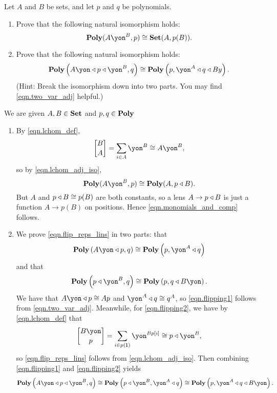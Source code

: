 \documentclass[Book-Poly]{subfiles}
\begin{document}
\begin{exercise}
Let $A$ and $B$ be sets, and let $p$ and $q$ be polynomials.
\begin{enumerate}
    \item Prove that the following natural isomorphism holds:
    \begin{equation}\label{eqn.monomials_and_comp}
    	\poly(A\yon^B,p)\iso\smset(A,p(B)).
    \end{equation}
    
    \item Prove that the following natural isomorphism holds:
    \begin{equation}\label{eqn.flip_reps_lins}
        \poly\left(A\yon\tri p\tri \yon^B, q\right)\iso\poly\left(p,\yon^A\tri q\tri By\right). %
    \end{equation}
    (Hint: Break the isomorphism down into two parts.
    You may find \cref{eqn.two_var_adj} helpful.)
    \qedhere
\end{enumerate}
\begin{solution}
We are given $A,B\in\mathbf{Set}$ and $p,q\in\mathbf{Poly}$
\begin{enumerate}
    \item By \eqref{eqn.lchom_def},
    \[
        \lchom{B}{A}=\sum_{i\in A}\yon^{B}\iso A\yon^B,
    \]
    so by \eqref{eqn.lchom_adj_iso},
    \[
        \poly(A\yon^B,p)\iso\poly(A,p\tri B).
    \]
    But $A$ and $p\mathbin{\triangleleft} B\cong p(B)$ are both constants, so a lens $A\to p\mathbin{\triangleleft} B$ is just a function $A\to p(B)$ on positions.
    Hence \eqref{eqn.monomials_and_comp} follows.

    \item We prove \eqref{eqn.flip_reps_lins} in two parts: that
    \begin{equation} \label{eqn.flipping1}
        \poly\left(A\yon\tri p, q\right)\iso\poly\left(p,\yon^A\tri q\right)
    \end{equation}
    and that
    \begin{equation} \label{eqn.flipping2}
        \poly\left(p \tri \yon^B, q\right)\cong\poly\left(p, q\tri B\yon\right).
    \end{equation}
    We have that $A\yon \tri p \iso Ap$ and $\yon^A \tri q \iso q^A$, so \eqref{eqn.flipping1} follows from \cref{eqn.two_var_adj}.
    Meanwhile, for \eqref{eqn.flipping2}, we have by \eqref{eqn.lchom_def} that
    \[
        \lchom{B\yon}{p}=\sum_{i\in p(\1)}\yon^{Bp[i]}\iso p\tri\yon^B,
    \]
    so \eqref{eqn.flip_reps_lins} follows from \eqref{eqn.lchom_adj_iso}.
    Then combining \cref{eqn.flipping1} and \cref{eqn.flipping2} yields
    \[
        \poly\left(A\yon\tri p\tri\yon^B,q\right)\iso\poly\left(p\tri\yon^B,\yon^A\tri q\right)\iso\poly\left(p,\yon^A\tri q\tri B\yon\right).
    \]
\end{enumerate}
\end{solution}
\end{exercise}
\end{document}
